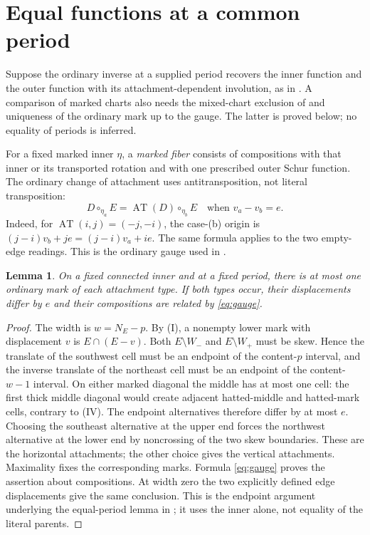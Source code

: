 \documentclass[11pt,a4paper]{amsart}
\numberwithin{equation}{section}
\theoremstyle{plain}
\newtheorem{lemma}[theorem]{Lemma}
\theoremstyle{definition}
\begin{document}
\section{Equal functions at a common period}\label{sec:transport}

Suppose the ordinary inverse at a supplied period recovers the inner function and the outer function with its attachment-dependent involution, as in .  A comparison of marked charts also needs the mixed-chart exclusion of  and uniqueness of the ordinary mark up to the gauge.  The latter is proved below; no equality of periods is inferred.


For a fixed marked inner \(\eta\), a \emph{marked fiber} consists of compositions with that inner or its transported rotation and with one prescribed outer Schur function.  The ordinary change of attachment uses antitransposition, not literal transposition:
\begin{equation}\label{eq:gauge}
 D\circ_{\eta_a}E=\operatorname{AT}(D)\circ_{\eta_b}E
 \quad\text{when }v_a-v_b=e.
\end{equation}
Indeed, for \(\operatorname{AT}(i,j)=(-j,-i)\), the case-(b) origin is
\((j-i)v_b+je=(j-i)v_a+ie\).
The same formula applies to the two empty-edge readings.  This is the ordinary gauge used in \cite{Shields2026Gluing}.

\begin{lemma}\label{lem:mark-atlas}
On a fixed connected inner and at a fixed period, there is at most one ordinary mark of each attachment type.  If both types occur, their displacements differ by \(e\) and their compositions are related by \eqref{eq:gauge}.
\end{lemma}
\begin{proof}
The width is \(w=N_E-p\).  By (I), a nonempty lower mark with displacement \(v\) is \(E\cap(E-v)\).  Both \(E\setminus W_-\) and \(E\setminus W_+\) must be skew.  Hence the translate of the southwest cell must be an endpoint of the content-\(p\) interval, and the inverse translate of the northeast cell must be an endpoint of the content-\(w-1\) interval.  On either marked diagonal the middle has at most one cell: the first thick middle diagonal would create adjacent hatted-middle and hatted-mark cells, contrary to (IV).  The endpoint alternatives therefore differ by at most \(e\).  Choosing the southeast alternative at the upper end forces the northwest alternative at the lower end by noncrossing of the two skew boundaries.  These are the horizontal attachments; the other choice gives the vertical attachments.  Maximality fixes the corresponding marks.  Formula \eqref{eq:gauge} proves the assertion about compositions.  At width zero the two explicitly defined edge displacements give the same conclusion.  This is the endpoint argument underlying the equal-period lemma in \cite{Shields2026Gluing}; it uses the inner alone, not equality of the literal parents.
\end{proof}
\end{document}
